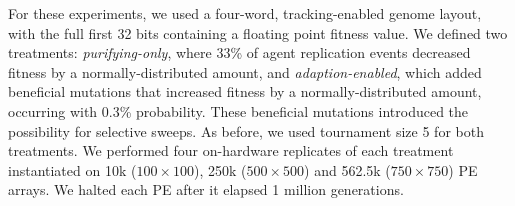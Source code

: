 

% 





For these experiments, we used a four-word, tracking-enabled genome layout, with the full first 32 bits containing a floating point fitness value.
We defined two treatments: \textit{purifying-only}, where 33\% of agent replication events decreased fitness by a normally-distributed amount,  and \textit{adaption-enabled}, which added beneficial mutations that increased fitness by a normally-distributed amount, occurring with 0.3\% probability.
These beneficial mutations introduced the possibility for selective sweeps.
As before, we used tournament size 5 for both treatments.
We performed four on-hardware replicates of each treatment instantiated on 10k ($100\times100$), 250k ($500\times500$) and 562.5k ($750\times750$) PE arrays.
We halted each PE after it elapsed 1 million generations.

